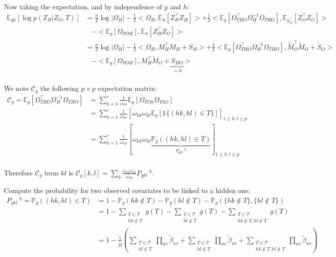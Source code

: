 \documentclass[11pt,a4paper]{article}
\newcommand{\Esp}{\mathds{E}}
\begin{document}
Now taking the expectation, and by independence of $g$ and $h$:
\begin{align*}
\Esp_{gh}[\log p(Z_H | Z_O,T) ] &=\frac{n}{2} \log |\Omega_H| -\frac{1}{2} <\Omega_H,\Esp_h[Z_H^\intercal Z_H]> +\frac{1}{2} <\Esp_g[\Omega_{THO}^\intercal \Omega_H^{-1}\Omega_{THO}],\Esp_{h_O^*}[Z_O^\intercal Z_O]> \\
&\;\;\; -<\Esp_g[\Omega_{TOH}],\Esp_h[Z_H^\intercal Z_O]>\\
&=\frac{n}{2} \log |\Omega_H|-\frac{1}{2} <\Omega_H,M_H^\intercal M_H + S_H> +\frac{1}{2} <\Esp_g[\Omega_{THO}^\intercal \Omega_H^{-1}\Omega_{THO}],\widetilde{M}_O^\intercal \widetilde{M}_O + \widetilde{S}_O>\\
&\;\;\; -<\Esp_g[\Omega_{TOH}],M_H^\intercal \widetilde{M}_O +  \underbrace{S_{HO}}_{=0}>
\end{align*}\\



We note $\mathcal{C}_g$ the following $p \times p$ expectation matrix:
\begin{align*}
\mathcal{C}_g=\Esp_g[\Omega_{THO}^\intercal \Omega_H^{-1}\Omega_{THO}] &= \sum_{h=1}^r \frac{1}{\omega_{hh}} \Esp_g[\Omega_{TOh} \Omega_{ThO}]\\
&= \sum_{h=1}^r \frac{1}{\omega_{hh}} \left[ \omega_{hk}\omega_{hl}\Esp_g[\mathds{1}\{(hk,hl)\in T\}]\right]_{1\leq k,l\leq p}\\
&=\sum_{h=1}^r \frac{1}{\omega_{hh}}[ \omega_{hk}\omega_{hl}\underbrace{\mathds{P}_g((hk,hl)\in T)}_{P_{gkl}\:^h}]_{1\leq k,l\leq p}
\end{align*}\\
Therefore $\mathcal{C}_g$ term $kl$ is $\mathcal{C}_g[k,l] = \sum_h \frac{\omega_{hk}\omega_{hl}}{\omega_{hh}} P_{gkl}\:^h$.


Compute the probability for two observed covariates to be linked to a hidden one:
\begin{align*}
P_{gkl}\:^h=\mathds{P}_g((hk,hl)\in T)&= 1 - \mathds{P}_g(hk \notin T)- \mathds{P}_g(hl \notin T) - \mathds{P}_g( \{hk \notin T\}, \{hl \notin T\})\\
&=1-\sum_{\substack{T \in \mathcal{T}\\ hk \notin T}} g(T)-\sum_{\substack{T \in \mathcal{T}\\ hl \notin T}} g(T)-\sum_{\substack{T \in \mathcal{T}\\ hk \notin T, hl \notin T}} g(T)\\
&= 1- \frac{1}{\widetilde{B}} \left( \sum_{\substack{T \in \mathcal{T}\\ hl \notin T}} \prod_{uv} \widetilde{\beta}_{uv} +\sum_{\substack{T \in \mathcal{T}\\ hl \notin T}}\prod_{uv} \widetilde{\beta}_{uv} +\sum_{\substack{T \in \mathcal{T}\\ hk \notin T, hl \notin T}}\prod_{uv} \widetilde{\beta}_{uv} \right)
\end{align*}
\end{document}
